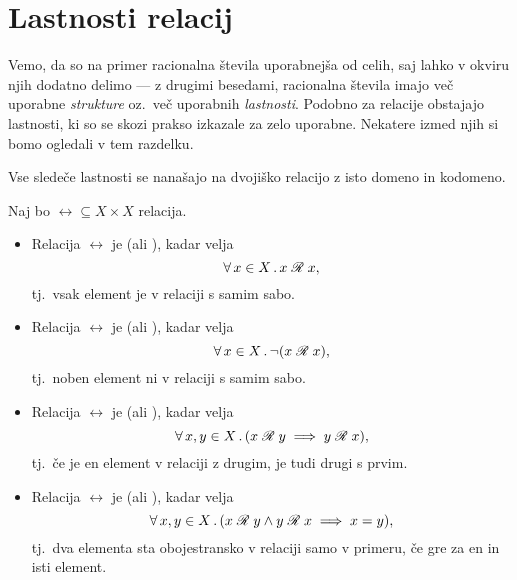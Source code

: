 	
	\section{Lastnosti relacij}\label{RAZDELEK: Lastnosti relacij}
	
		Vemo, da so na primer racionalna števila uporabnejša od celih, saj lahko v okviru njih dodatno delimo --- z drugimi besedami, racionalna števila imajo več uporabne \emph{strukture} oz.~več uporabnih \emph{lastnosti}. Podobno za relacije obstajajo lastnosti, ki so se skozi prakso izkazale za zelo uporabne. Nekatere izmed njih si bomo ogledali v tem razdelku.
		
		Vse sledeče lastnosti se nanašajo na dvojiško relacijo z isto domeno in kodomeno.
		
		\begin{definicija}
			Naj bo $\rel \subseteq X \times X$ relacija.
			\begin{itemize}
				\item
					Relacija $\rel$ je  (ali ), kadar velja
					\[\xall{x}[X]{\rel[x][x]},\]
					tj.~vsak element je v relaciji s samim sabo.
				\item
					Relacija $\rel$ je  (ali ), kadar velja
					\[\xall{x}[X]{\lnot(\rel[x][x])},\]
					tj.~noben element ni v relaciji s samim sabo.
				\item
					Relacija $\rel$ je  (ali ), kadar velja
					\[\all{x, y}[X]{\rel[x][y] \implies \rel[y][x]},\]
					tj.~če je en element v relaciji z drugim, je tudi drugi s prvim.
				\item
					Relacija $\rel$ je  (ali ), kadar velja
					\[\all{x, y}[X]{\rel[x][y] \land \rel[y][x] \implies x = y},\]
					tj.~dva elementa sta obojestransko v relaciji samo v primeru, če gre za en in isti element.
					

\end{itemize}
\end{definicija}
